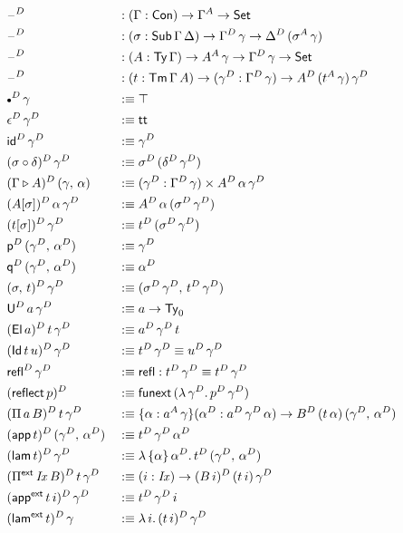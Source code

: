 \documentclass[12pt,a4paper,twoside,openany]{book}
\theoremstyle{remark}
\theoremstyle{definition}
\theoremstyle{theorem}
\newcommand{\mi}[1]{\mathit{#1}}
\newcommand{\ms}[1]{\mathsf{#1}}
\newcommand{\funext}{\ms{funext}}
\newcommand{\refl}{\mathsf{refl}}
\newcommand{\reflect}{\mathsf{reflect}}
\newcommand{\id}{\mathsf{id}}
\newcommand{\Con}{\mathsf{Con}}
\newcommand{\Sub}{\mathsf{Sub}}
\newcommand{\Tm}{\mathsf{Tm}}
\newcommand{\Ty}{\mathsf{Ty}}
\newcommand{\U}{\mathsf{U}}
\newcommand{\El}{\mathsf{El}}
\newcommand{\Id}{\mathsf{Id}}
\renewcommand{\tt}{\mathsf{tt}}
\newcommand{\blank}{\mathord{\hspace{1pt}\text{--}\hspace{1pt}}}
\newcommand{\Set}{\mathsf{Set}}
\newcommand{\ext}{\triangleright}
\newcommand{\emptycon}{\scaleobj{.75}\bullet}
\newcommand{\Pie}{\Pi^{\mathsf{ext}}}
\newcommand{\appe}{\mathsf{app^{ext}}}
\newcommand{\lame}{\mathsf{lam^{ext}}}
\newcommand{\p}{\mathsf{p}}
\newcommand{\q}{\mathsf{q}}
\newcommand{\app}{\ms{app}}
\newcommand{\lam}{\ms{lam}}
\newcommand{\defn}{:\equiv}
\begin{document}
\begin{alignat*}{3}
  &\blank^D &&: (\Gamma : \Con) \to \Gamma^A \to \Set\\
  &\blank^D &&: (\sigma : \Sub\,\Gamma\,\Delta) \to \Gamma^D\,\gamma \to \Delta^D\,(\sigma^A\,\gamma) \\
  &\blank^D &&: (A : \Ty\,\Gamma) \to A^A\,\gamma \to \Gamma^D\,\gamma \to \Set\\
  &\blank^D &&: (t : \Tm\,\Gamma\,A) \to (\gamma^D : \Gamma^D\,\gamma) \to A^D\,(t^A\,\gamma)\,\gamma^D\\
  &\emptycon^D\,\gamma &&\defn \top\\
  &\epsilon^D\,\gamma^D &&\defn \tt\\
  &\id^D\,\gamma^D &&\defn \gamma^D\\
  &(\sigma \circ \delta)^D\,\gamma^D &&\defn \sigma^D\,(\delta^D\,\gamma^D)\\
  &(\Gamma \ext A)^D\,(\gamma,\,\alpha) &&\defn (\gamma^D : \Gamma^D\,\gamma) \times A^D\,\alpha\,\gamma^D\\
  &(A[\sigma])^D\,\alpha\,\gamma^D &&\defn A^D\,\alpha\,(\sigma^D\,\gamma^D)\\
  &(t[\sigma])^D\,\gamma^D &&\defn t^D\,(\sigma^D\,\gamma^D)\\
  &\p^D\,(\gamma^D,\,\alpha^D) &&\defn \gamma^D\\
  &\q^D\,(\gamma^D,\,\alpha^D) &&\defn \alpha^D\\
  &(\sigma,\,t)^D\,\gamma^D &&\defn (\sigma^D\,\gamma^D,\,t^D\,\gamma^D)\\
  &\U^D\,a\,\gamma^D &&\defn a \to \Ty_0\\
  &(\El\,a)^D\,t\,\gamma^D &&\defn a^D\,\gamma^D\,t\\
  &(\Id\,t\,u)^D\,\gamma^D &&\defn t^D\,\gamma^D \equiv u^D\,\gamma^D\\
  &\refl^D\,\gamma^D &&\defn \refl : t^D\,\gamma^D \equiv t^D\,\gamma^D\\
  &(\reflect\,p)^D &&\defn \funext\,(\lambda\,\gamma^D.\,p^D\,\gamma^D)\\
  &(\Pi\,a\,B)^D\,t\,\gamma^D &&\defn \{\alpha : a^A\,\gamma\}(\alpha^D : a^D\,\gamma^D\,\alpha)
    \to B^D\,(t\,\alpha)\,(\gamma^D,\,\alpha^D)\\
  &(\app\,t)^D\,(\gamma^D,\,\alpha^D) &&\defn t^D\,\gamma^D\,\alpha^D\\
  &(\lam\,t)^D\,\gamma^D &&\defn \lambda\,\{\alpha\}\,\alpha^D.\,t^D\,(\gamma^D,\,\alpha^D)\\
  &(\Pie\,\mi{Ix}\,B)^D\,t\,\gamma^D &&\defn (i : \mi{Ix}) \to (B\,i)^D\,(t\,i)\,\gamma^D\\
  &(\appe\,t\,i)^D\,\gamma^D &&\defn t^D\,\gamma^D\,i\\
  &(\lame\,t)^D\,\gamma &&\defn \lambda\,i.\,(t\,i)^D\,\gamma^D
\end{alignat*}
\end{document}
